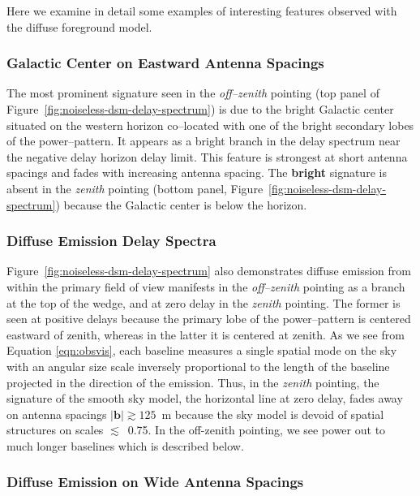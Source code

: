 \documentclass[preprint2,iop,numberedappendix]{emulateapj}
\begin{document}
Here we examine in detail some examples of interesting features observed with the diffuse foreground model.

\subsubsection{Galactic Center on Eastward Antenna Spacings}\label{sec:GC-east}

The most prominent signature seen in the {\it off--zenith} pointing (top panel of Figure~\ref{fig:noiseless-dsm-delay-spectrum}) is due to the bright Galactic center situated on the western horizon co--located with one of the bright secondary lobes of the power--pattern. It appears as a bright branch in the delay spectrum near the negative delay horizon delay limit. This feature is strongest at short antenna spacings and fades with increasing antenna spacing. The {\bf bright} signature is absent in the {\it zenith} pointing (bottom panel, Figure~\ref{fig:noiseless-dsm-delay-spectrum}) because the Galactic center is below the horizon. 

\subsubsection{Diffuse Emission Delay Spectra}\label{sec:diffuse-features}

Figure~\ref{fig:noiseless-dsm-delay-spectrum} also demonstrates diffuse emission from within the primary field of view manifests in the {\it off--zenith} pointing as a branch at the top of the wedge, and at zero delay in the {\it zenith} pointing. The former is seen at positive delays because the primary lobe of the power--pattern is centered eastward of zenith, whereas in the latter it is centered at zenith. As we see from Equation \ref{eqn:obsvis}, each baseline measures a single spatial mode on the sky with an angular size scale inversely proportional to the length of the baseline projected in the direction of the emission. Thus, in the {\it zenith} pointing, the signature of the smooth sky model, the horizontal line at zero delay, fades away on antenna spacings $|\boldsymbol{b}| \gtrsim 125$~m because the sky model is devoid of spatial structures on scales $\lesssim$~0.75\arcdeg. In the off-zenith pointing, we see power out to much longer baselines which is described below.

\subsubsection{Diffuse Emission on Wide Antenna Spacings}\label{sec:diffuse-long-baselines}
\end{document}
